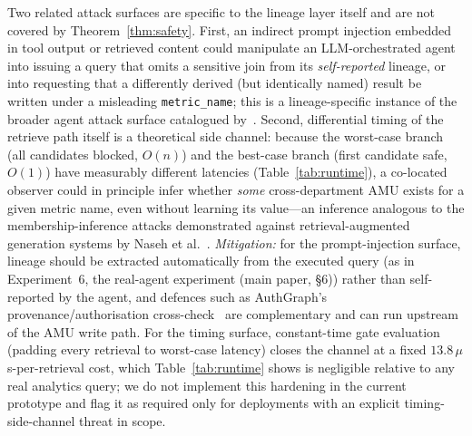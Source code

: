 \documentclass[9pt,twocolumn,twoside]{extarticle}
\begin{document}
\begin{description}[leftmargin=1.2em,itemsep=3pt]
\item[T8 --- Prompt-injection and timing attacks on the lineage record.]
  Two related attack surfaces are specific to the lineage layer itself and are
  not covered by Theorem~\ref{thm:safety}.
  First, an indirect prompt injection embedded in tool output or retrieved
  content could manipulate an LLM-orchestrated agent into issuing a query that
  omits a sensitive join from its \emph{self-reported} lineage, or into
  requesting that a differently derived (but identically named) result be
  written under a misleading \texttt{metric\_name}; this is a lineage-specific
  instance of the broader agent attack surface catalogued
  by~\cite{wang2026landscape,dehghantanha2026sok,alizadeh2025leak,naik2026omnileak}.
  Second, differential timing of the retrieve path itself is a theoretical
  side channel: because the worst-case branch (all candidates blocked, $O(n)$)
  and the best-case branch (first candidate safe, $O(1)$) have measurably
  different latencies (Table~\ref{tab:runtime}), a co-located observer could in
  principle infer whether \emph{some} cross-department AMU exists for a given
  metric name, even without learning its value---an inference analogous to the
  membership-inference attacks demonstrated against retrieval-augmented
  generation systems by Naseh et al.~\cite{naseh2025riddle}.
  \textit{Mitigation:} for the prompt-injection surface, lineage should be
  extracted automatically from the executed query (as in Experiment~6,
  the real-agent experiment (main paper, \S6)) rather than self-reported by the agent, and defences such
  as AuthGraph's provenance/authorisation cross-check~\cite{wang2026authgraph}
  are complementary and can run upstream of the AMU write path.
  For the timing surface, constant-time gate evaluation (padding every
  retrieval to worst-case latency) closes the channel at a fixed
  $13.8\,\mu$s-per-retrieval cost, which Table~\ref{tab:runtime} shows is
  negligible relative to any real analytics query; we do not implement this
  hardening in the current prototype and flag it as required only for
  deployments with an explicit timing-side-channel threat in scope.
\end{description}

\end{document}
